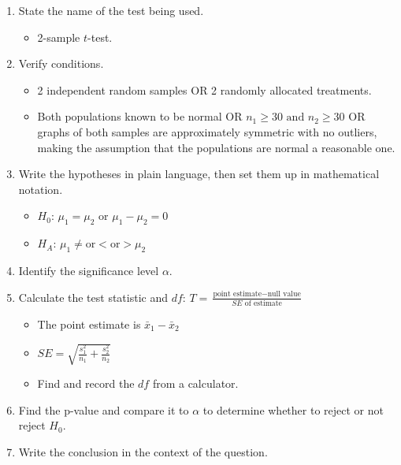 \begin{termBox}{
\begin{enumerate}
\setlength{\itemsep}{0mm}
\item State the name of the test being used.\vspace{-1.5mm}
\begin{itemize}
\setlength{\itemsep}{0mm}
\item 2-sample $t$-test.
\end{itemize}
\item Verify conditions.\vspace{-1.5mm}
\begin{itemize}
\setlength{\itemsep}{0mm}
\item 2 independent random samples OR 2 randomly allocated treatments.
\item Both populations known to be normal OR $n_1 \ge 30 \text{ and } n_2\ge 30$ OR graphs of both samples are approximately symmetric with no outliers, making the assumption that the populations are normal a reasonable one.
\end{itemize}
\item Write the hypotheses in plain language, then set them up in mathematical notation.\vspace{-1.5mm}
\begin{itemize}
\setlength{\itemsep}{0mm}
\item $H_0$: $\mu_1 = \mu_2$ or  $\mu_1 - \mu_2 = 0$
\item $H_A$: $\mu_1 \ne \text{or} < \text{or} > \mu_2$
\end{itemize}
\item Identify the significance level $\alpha$.
\item Calculate the test statistic and $df$: $T = \frac{\text{point estimate} - \text{null value}}{SE \text{ of estimate}}$
\begin{itemize}
\setlength{\itemsep}{0mm}
\item The point estimate is $\bar{x}_1-\bar{x}_2$
\item $SE = \sqrt{\frac{s^2_1}{n_1}+\frac{s^2_2}{n_2}}$
\item Find and record the $df$ from a calculator.
\end{itemize}
\item Find the p-value and compare it to $\alpha$ to determine whether to reject or not reject $H_0$.
\item Write the conclusion in the context of the question.
\end{enumerate}}
\end{termBox}

